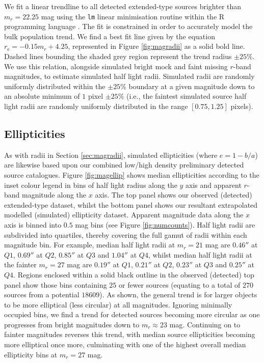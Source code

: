 \documentclass[fleqn,usenatbib,useAMS]{mnras}
\begin{document}
We fit a linear trendline to all detected extended-type sources brighter than $m_r=22.25$ mag using the \texttt{lm} linear minimisation routine \citep{Chambers1992} within the \textsc{R} programming language \citep{RCoreTeam}. The fit is constrained in order to accurately model the bulk population trend. We find a best fit line given by the equation $r_\mathrm{e}=-0.15m_r+4.25$, represented in Figure \ref{fig:magradii} as a solid bold line. Dashed lines bounding the shaded grey region represent the trend radius $\pm25\%$. We use this relation, alongside simulated bright mock and faint missing $r$-band magnitudes, to estimate simulated half light radii. Simulated radii are randomly uniformly distributed within the $\pm25\%$ boundary at a given magnitude down to an absolute minimum of $1$ pixel $\pm25\%$ (i.e., the faintest simulated source half light radii are randomly uniformly distributed in the range $[0.75,1.25]$ pixels). 

\subsection{Ellipticities}
\label{sec:magellip}

As with radii in Section \ref{sec:magradii}, simulated ellipticities (where $e=1-b/a$) are likewise based upon our combined low/high density preliminary detected source catalogues. Figure \ref{fig:magellip} shows median ellipticities according to the inset colour legend in bins of half light radius along the $y$ axis and apparent $r$-band magnitude along the $x$ axis. The top panel shows our observed (detected) extended-type dataset, whilst the bottom panel shows our resultant extrapolated modelled (simulated) ellipticity dataset. Apparent magnitude data along the $x$ axis is binned into $0.5$ mag bins (see Figure \ref{fig:numcounts}). Half light radii are subdivided into quartiles, thereby covering the full gamut of radii within each magnitude bin. For example, median half light radii at $m_r=21$ mag are $0.46''$ at $Q1$, $0.69''$ at $Q2$, $0.85''$ at $Q3$ and $1.04''$ at $Q4$, whilst median half light radii at the fainter $m_r=27$ mag are $0.19''$ at $Q1$, $0.21''$ at $Q2$, $0.23''$ at $Q3$ and $0.25''$ at $Q4$. Regions enclosed within a solid black outline in the observed (detected) top panel show those bins containing $25$ or fewer sources (equating to a total of $270$ sources from a potential $18609$). As shown, the general trend is for larger objects to be more elliptical (less circular) at all magnitudes. Ignoring minimally occupied bins, we find a trend for detected sources becoming more circular as one progresses from bright magnitudes down to $m_r\approx23$ mag. Continuing on to fainter magnitudes reverses this trend, with median source ellipticities becoming more elliptical once more, culminating with one of the highest overall median ellipticity bins at $m_r=27$ mag. 
\end{document}
